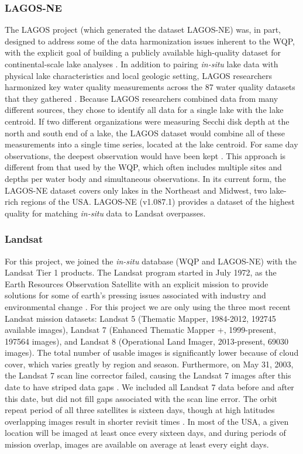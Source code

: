 \documentclass[]{agujournal2018}
\begin{document}
\subsubsection{LAGOS-NE}

The LAGOS project (which generated the dataset LAGOS-NE) was, in part,
designed to address some of the data harmonization issues inherent to
the WQP, with the explicit goal of building a publicly available
high-quality dataset for continental-scale lake analyses
\citep{Soranno2015,Soranno2017}. In addition to pairing \emph{in-situ}
lake data with physical lake characteristics and local geologic setting,
LAGOS researchers harmonized key water quality measurements across the
87 water quality datasets that they gathered
\citep{Soranno2015,Soranno2017}. Because LAGOS researchers combined data
from many different sources, they chose to identify all data for a
single lake with the lake centroid. If two different organizations were
measuring Secchi disk depth at the north and south end of a lake, the
LAGOS dataset would combine all of these measurements into a single time
series, located at the lake centroid. For same day observations, the
deepest observation would have been kept \citep{Soranno2015}. This
approach is different from that used by the WQP, which often includes
multiple sites and depths per water body and simultaneous observations.
In its current form, the LAGOS-NE dataset covers only lakes in the
Northeast and Midwest, two lake-rich regions of the USA. LAGOS-NE
(v1.087.1) provides a dataset of the highest quality for matching
\emph{in-situ} data to Landsat overpasses.

\subsubsection{Landsat}

For this project, we joined the \emph{in-situ} database (WQP and
LAGOS-NE) with the Landsat Tier 1 products. The Landsat program started
in July 1972, as the Earth Resources Observation Satellite with an
explicit mission to provide solutions for some of earth's pressing
issues associated with industry and environmental change
\citep{Loveland2012}. For this project we are only using the three most
recent Landsat mission datasets: Landsat 5 (Thematic Mapper, 1984-2012,
192745 available images), Landsat 7 (Enhanced Thematic Mapper +,
1999-present, 197564 images), and Landsat 8 (Operational Land Imager,
2013-present, 69030 images). The total number of usable images is
significantly lower because of cloud cover, which varies greatly by
region and season. Furthermore, on May 31, 2003, the Landsat 7 scan line
corrector failed, causing the Landsat 7 images after this date to have
striped data gaps \citep{Storey2005}. We included all Landsat 7 data
before and after this date, but did not fill gaps associated with the
scan line error. The orbit repeat period of all three satellites is
sixteen days, though at high latitudes overlapping images result in
shorter revisit times \citep{Loveland2012,Wulder2016}. In most of the
USA, a given location will be imaged at least once every sixteen days,
and during periods of mission overlap, images are available on average
at least every eight days.
\end{document}
